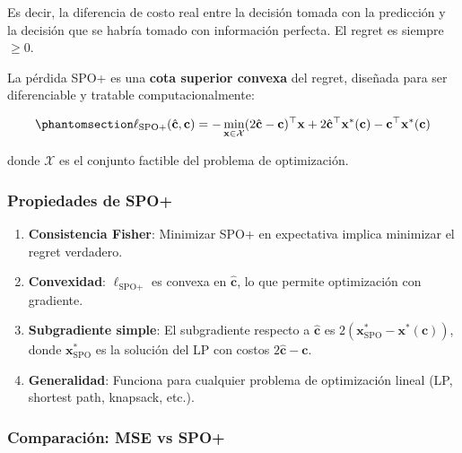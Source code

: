 \documentclass[
  spanish,
  11pt,
  letterpaper,
]{scrbook}
\providecommand{\tightlist}{%
  \setlength{\itemsep}{0pt}\setlength{\parskip}{0pt}}
\theoremstyle{plain}
\theoremstyle{remark}
\begin{document}
Es decir, la diferencia de costo real entre la decisión tomada con la
predicción y la decisión que se habría tomado con información perfecta.
El regret es siempre \(\geq 0\).

La pérdida SPO+ es una \textbf{cota superior convexa} del regret,
diseñada para ser diferenciable y tratable computacionalmente:

\begin{equation}\protect\phantomsection\label{eq-spo-plus-loss}{
\ell_{\text{SPO+}}(\hat{\mathbf{c}}, \mathbf{c}) = -\min_{\mathbf{x} \in \mathcal{X}} (2\hat{\mathbf{c}} - \mathbf{c})^\top \mathbf{x} + 2\hat{\mathbf{c}}^\top \mathbf{x}^*(\mathbf{c}) - \mathbf{c}^\top \mathbf{x}^*(\mathbf{c})
}\end{equation}

donde \(\mathcal{X}\) es el conjunto factible del problema de
optimización.

\subsubsection{Propiedades de SPO+}\label{propiedades-de-spo}

\begin{enumerate}
\def\labelenumi{\arabic{enumi}.}
\tightlist
\item
  \textbf{Consistencia Fisher}: Minimizar SPO+ en expectativa implica
  minimizar el regret verdadero.
\item
  \textbf{Convexidad}: \(\ell_{\text{SPO+}}\) es convexa en
  \(\hat{\mathbf{c}}\), lo que permite optimización con gradiente.
\item
  \textbf{Subgradiente simple}: El subgradiente respecto a
  \(\hat{\mathbf{c}}\) es
  \(2(\mathbf{x}^*_{\text{SPO}} - \mathbf{x}^*(\mathbf{c}))\), donde
  \(\mathbf{x}^*_{\text{SPO}}\) es la solución del LP con costos
  \(2\hat{\mathbf{c}} - \mathbf{c}\).
\item
  \textbf{Generalidad}: Funciona para cualquier problema de optimización
  lineal (LP, shortest path, knapsack, etc.).
\end{enumerate}

\subsubsection{Comparación: MSE vs
SPO+}\label{comparaciuxf3n-mse-vs-spo}
\end{document}
